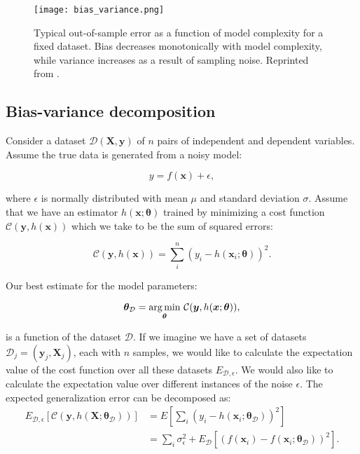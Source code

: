 \begin{figure}[h]
    \centering
    \texttt{[image: bias\_variance.png]}
    \caption{Typical out-of-sample error as a function
    of model complexity for a fixed dataset. Bias decreases monotonically with
    model complexity, while variance increases as a result of
    sampling noise. Reprinted from \parencite[Mehta et al. page 11]{
        mehta2019high}.}
    \label{fig:bias-variance}
\end{figure}

\subsection{Bias-variance decomposition}
Consider a dataset $\mathcal{D}(\bm{X}, \bm{y})$ of $n$ pairs
of independent and dependent variables. Assume the true data
is generated from a noisy model:

\begin{equation}
 y = f(\bm{x}) + \epsilon ,
\end{equation}

where $\epsilon$ is normally distributed with mean $\mu$ and
standard deviation $\sigma$. Assume that we have an estimator $h(\bm{x}; \bm{\theta})$
trained by minimizing a cost function $\mathcal{C}(\bm{y}, h(\bm{x}))$
which we take to be the sum of squared errors:

\begin{equation}
 \mathcal{C}(\bm{y}, h(\bm{x})) = \sum_i^n (y_i - h(\bm{x}_i; \bm{\theta}))^2 .
\end{equation}

Our best estimate for the model parameters:

\begin{equation}
 \bm{\theta}_{\mathcal{D}} = \underset{\bm{\theta}}{\operatorname*{arg\,min}} \
\mathcal{C}(\bm{y}, h(\bm{x}; \bm{\theta})) ,
\end{equation}

is a function of the dataset $\mathcal{D}$. If we imagine we have a set of
datasets $\mathcal{D}_j = (\bm{y}_j, \bm{X}_j)$, each with $n$ samples, we would like to calculate
the expectation value of the cost function over all these datasets $E_{\mathcal{D}, \epsilon}$.
We would also like to calculate the expectation value over different instances of the noise $\epsilon$.
The expected generalization error can be decomposed as:
\begin{equation}
\begin{split}
    E_{\mathcal{D}, \epsilon} [\mathcal{C}(\bm{y}, h(\bm{X} ; \bm{\theta}_{\mathcal{D}}))]
    &= E \left[ \sum_i (y_i - h(\bm{x}_i ; \bm{\theta}_{\mathcal{D}}))^2 \right] \\
    &= \sum_i \sigma_{\epsilon}^2 + E_{\mathcal{D}}[(f(\bm{x}_i) - f(\bm{x}_i ; \bm{\theta}_{\mathcal{D}}))^2] .
\end{split}
\end{equation}

